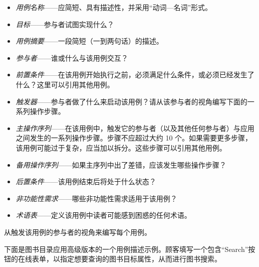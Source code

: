 \begin{itemize}
\item \emph{用例名称}——应简短、具有描述性，并采用“动词—名词”形式。
\item \emph{目标}——参与者试图实现什么？
\item \emph{用例摘要}——一段简短（一到两句话）的描述。
\item \emph{参与者}——谁或什么与该用例交互？
\item \emph{前置条件}——在该用例开始执行之前，必须满足什么条件，或必须已经发生了什么？这里可以引用其他用例。
\item \emph{触发器}——参与者做了什么来启动该用例？请从该参与者的视角编写下面的一系列操作步骤。
\item \emph{主操作序列}——在该用例中，触发它的参与者（以及其他任何参与者）与应用之间发生的一系列操作步骤。步骤不应超过大约 10 个。如果需要更多步骤，该用例可能过于复杂，应当加以拆分。这些步骤可以引用其他用例。
\item \emph{备用操作序列}——如果主序列中出了差错，应该发生哪些操作步骤？
\item \emph{后置条件}——该用例结束后将处于什么状态？
\item \emph{非功能性需求}——哪些非功能性需求适用于该用例？
\item \emph{术语表}——定义该用例中读者可能感到困惑的任何术语。
\end{itemize}

从触发该用例的参与者的视角来编写每个用例。

下面是图书目录应用高级版本的一个用例描述示例。顾客填写一个包含“Search”按钮的在线表单，以指定想要查询的图书目标属性，从而进行图书搜索。


